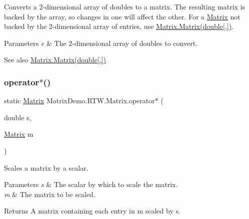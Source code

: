 Converts a 2-\/dimensional array of doubles to a matrix. The resulting matrix is backed by the array, so changes in one will affect the other. For a \mbox{\hyperlink{class_matrix_demo_1_1_r_t_w_1_1_matrix}{Matrix}} not backed by the 2-\/dimensional array of entries, use \mbox{\hyperlink{class_matrix_demo_1_1_r_t_w_1_1_matrix_ad2a320fd0c86551f34070679fd43433c}{Matrix.\+Matrix(double\mbox{[},\mbox{]})}}. 


\begin{DoxyParams}{Parameters}
{\em e} & The 2-\/dimensional array of doubles to convert.\\
\hline
\end{DoxyParams}
\begin{DoxySeeAlso}{See also}
\mbox{\hyperlink{class_matrix_demo_1_1_r_t_w_1_1_matrix_ad2a320fd0c86551f34070679fd43433c}{Matrix.\+Matrix(double\mbox{[},\mbox{]})}}


\end{DoxySeeAlso}
\mbox{\label{class_matrix_demo_1_1_r_t_w_1_1_matrix_ae315e38f4441e1df65dd5226b55314ea}} 
\subsubsection{\texorpdfstring{operator$\ast$()}{operator*()}\hspace{0.1cm}{\footnotesize\ttfamily [1/2]}}
{\footnotesize\ttfamily static \mbox{\hyperlink{class_matrix_demo_1_1_r_t_w_1_1_matrix}{Matrix}} Matrix\+Demo.\+R\+T\+W.\+Matrix.\+operator$\ast$ (\begin{DoxyParamCaption}\item[{double}]{s,  }\item[{\mbox{\hyperlink{class_matrix_demo_1_1_r_t_w_1_1_matrix}{Matrix}}}]{m }\end{DoxyParamCaption})\hspace{0.3cm}{\ttfamily [static]}}



Scales a matrix by a scalar. 


\begin{DoxyParams}{Parameters}
{\em s} & The scalar by which to scale the matrix.\\
\hline
{\em m} & The matrix to be scaled.\\
\hline
\end{DoxyParams}
\begin{DoxyReturn}{Returns}
A matrix containing each entry in {\ttfamily m} scaled by {\ttfamily s}.
\end{DoxyReturn}
\mbox{\label{class_matrix_demo_1_1_r_t_w_1_1_matrix_a5d72530d3d2ddc47341e82ec1a076b71}} 
